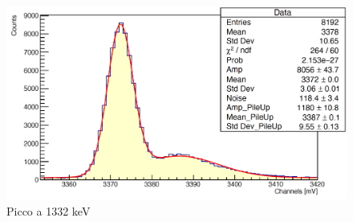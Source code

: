 \documentclass[a4paper,10pt]{article}
\begin{document}
\begin{figure}[H]
    \centering
    \includegraphics[scale=0.45]{appendice/spettri/CoCu2_54}
    \caption{Picco a 1332 keV}
\end{figure}
\end{document}

